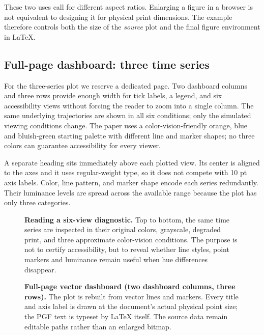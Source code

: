 \documentclass[10pt,twocolumn,a4paper]{article}
\begin{document}
These two uses call for different aspect ratios. Enlarging a figure in a
browser is not equivalent to designing it for physical print dimensions.
The example therefore controls both the size of the \emph{source} plot and
the final figure environment in LaTeX.

\subsection{Full-page dashboard: three time series}
For the three-series plot we reserve a dedicated page. Two dashboard
columns and three rows provide enough width for tick labels, a legend,
and six accessibility views without forcing the reader to zoom into a
single column. The same underlying trajectories are shown in all six
conditions; only the simulated viewing conditions change. The paper uses
a color-vision-friendly orange, blue and bluish-green starting palette
with different line and marker shapes; no three colors can guarantee
accessibility for every viewer.

A separate heading sits immediately above each plotted view.
Its center is aligned to the axes and it uses regular-weight type,
so it does not compete with 10 pt axis labels. Color, line pattern, and marker shape encode each series
redundantly. Their luminance levels are spread across the available range
because the plot has only three categories.

\clearpage
\begin{figure}[p]
  \centering
  \begin{minipage}{\textwidth}
    \small
    \textbf{Reading a six-view diagnostic.}
    Top to bottom, the same time series are inspected in their original
    colors, grayscale, degraded print, and three approximate color-vision
    conditions. The purpose is not to certify accessibility, but to reveal
    whether line styles, point markers and luminance remain useful when hue
    differences disappear.
  \end{minipage}\par\medskip
  
  \caption{\textbf{Full-page vector dashboard (two dashboard columns,
  three rows).} The plot is rebuilt from vector lines and markers.
  Every title and axis label is drawn at the document's actual physical
  point size; the PGF text is typeset by LaTeX itself. The source data
  remain editable paths rather than an enlarged bitmap.}
  \label{fig:access}
\end{figure}
\clearpage
\end{document}
